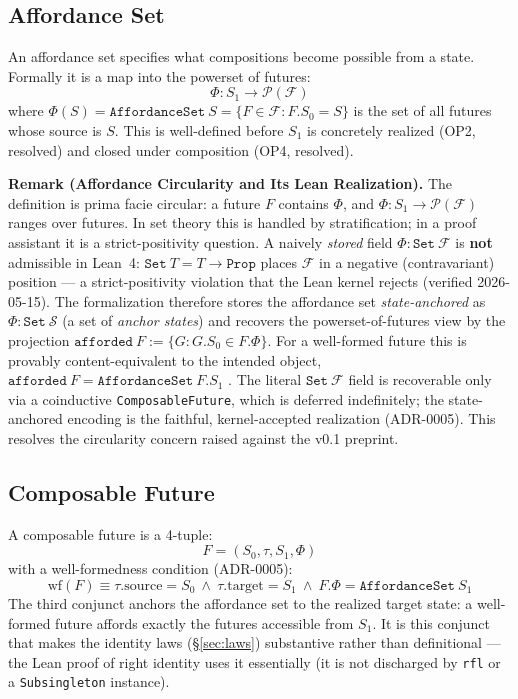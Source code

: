 \documentclass[11pt,a4paper]{article}
\newcommand{\Future}{\mathcal{F}}
\newcommand{\well}{\text{wf}}
\begin{document}
\subsection{Affordance Set}

An affordance set specifies what compositions become possible from a state.
Formally it is a map into the powerset of futures:
\[
\Phi : S_1 \to \mathcal{P}(\Future)
\]
where $\Phi(S) = \texttt{AffordanceSet}~S = \{F \in \Future : F.S_0 = S\}$ is
the set of all futures whose source is $S$. This is well-defined before $S_1$
is concretely realized (OP2, resolved) and closed under composition (OP4,
resolved).

\textbf{Remark (Affordance Circularity and Its Lean Realization).} The
definition is prima facie circular: a future $F$ contains $\Phi$, and
$\Phi : S_1 \to \mathcal{P}(\Future)$ ranges over futures. In set theory this
is handled by stratification; in a proof assistant it is a strict-positivity
question. A naively \emph{stored} field $\Phi : \texttt{Set}~\Future$ is
\textbf{not} admissible in Lean~4: $\texttt{Set}~T = T \to \texttt{Prop}$
places $\Future$ in a negative (contravariant) position --- a strict-positivity
violation that the Lean kernel rejects (verified 2026-05-15). The
formalization therefore stores the affordance set \emph{state-anchored} as
$\Phi : \texttt{Set}~\mathcal{S}$ (a set of \emph{anchor states}) and recovers
the powerset-of-futures view by the projection
$\texttt{afforded}~F := \{G : G.S_0 \in F.\Phi\}$. For a well-formed future
this is provably content-equivalent to the intended object,
$\texttt{afforded}~F = \texttt{AffordanceSet}~F.S_1$
. The literal
$\texttt{Set}~\Future$ field is recoverable only via a coinductive
\texttt{ComposableFuture}, which is deferred indefinitely; the state-anchored
encoding is the faithful, kernel-accepted realization (ADR-0005). This
resolves the circularity concern raised against the v0.1 preprint.

\subsection{Composable Future}

A composable future is a 4-tuple:
\[
F = (S_0, \tau, S_1, \Phi)
\]
with a well-formedness condition (ADR-0005):
\[
\well(F) \equiv \tau.\text{source} = S_0 \ \land\ \tau.\text{target} = S_1
            \ \land\ F.\Phi = \texttt{AffordanceSet}~S_1
\]
The third conjunct anchors the affordance set to the realized target state:
a well-formed future affords exactly the futures accessible from $S_1$. It is
this conjunct that makes the identity laws (\S\ref{sec:laws}) substantive
rather than definitional --- the Lean proof of right identity uses it
essentially (it is not discharged by \texttt{rfl} or a \texttt{Subsingleton}
instance).
\end{document}
